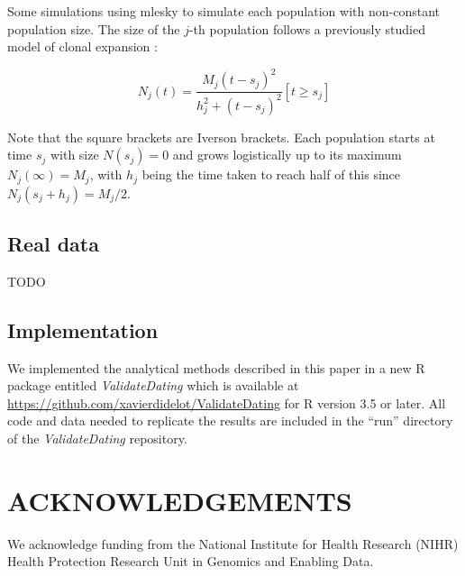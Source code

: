 \documentclass{article}
\begin{document}
Some simulations using mlesky \citep{Didelot2023mlesky} to simulate each population with non-constant population size. The size of the $j$-th population follows a previously studied model of clonal expansion \citep{Helekal2021}:

\begin{equation}
N_j(t)=\frac{M_j(t-s_j)^2}{h_j^2+(t-s_j)^2}[t \geq s_j]
\end{equation}

Note that the square brackets are Iverson brackets. Each population starts at time $s_j$ with size $N(s_j)=0$ and grows logistically up to its maximum $N_j(\infty)=M_j$, with $h_j$ being the time taken to reach half of this since $N_j(s_j+h_j)=M_j/2$. 


\subsection*{Real data}

TODO

\subsection*{Implementation}

We implemented the analytical methods described in this paper in a 
new R package entitled \emph{ValidateDating} which is available
at \url{https://github.com/xavierdidelot/ValidateDating} for R version 3.5 or later. 
All code and data needed to replicate the results are included in the ``run'' directory of the \emph{ValidateDating} repository.

\section*{ACKNOWLEDGEMENTS}

We acknowledge funding from the National Institute for Health Research (NIHR) Health Protection Research Unit in Genomics and Enabling Data.

\newpage


%

\newpage
\setcounter{figure}{0}
\setcounter{table}{0}
\makeatletter 
\renewcommand{\thefigure}{S\@arabic\c@figure} 
\renewcommand{\thetable}{S\@arabic\c@table} 
\makeatother
\end{document}
